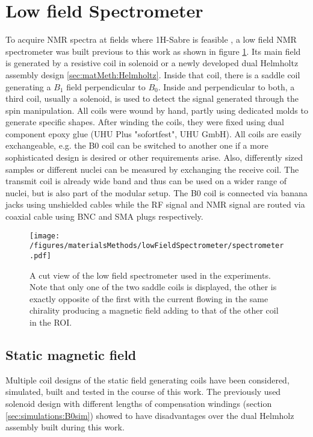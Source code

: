         \section{Low field Spectrometer}
        \label{sec:matMeth:lowFieldSpectrometer}
        To acquire NMR spectra at fields where 1H-Sabre is feasible \cite{rayner_signal_2018}, a low field NMR spectrometer was built \cite{borowiak_battery-driven_2013-1} previous to this work as shown in figure \ref{figure:materialsMethods:lowFieldSpec}. Its main field is generated by a resistive coil in solenoid or a newly developed dual Helmholtz assembly design \ref{sec:matMeth:Helmholtz}. Inside that coil, there is a saddle coil generating a $B_1$ field perpendicular to $B_0$. Inside and perpendicular to both, a third coil, usually a solenoid, is used to detect the signal generated through the spin manipulation. All coils were wound by hand, partly using dedicated molds to generate specific shapes. After winding the coils, they were fixed using dual component epoxy glue (UHU Plus "sofortfest", UHU GmbH).
        All coils are easily exchangeable, e.g. the B0 coil can be switched to another one if a more sophisticated design is desired or other requirements arise. Also, differently sized samples or different nuclei can be measured by exchanging the receive coil. The transmit coil is already wide band and thus can be used on a wider range of nuclei, but is also part of the modular setup. The B0 coil is connected via banana jacks using unshielded cables while the RF signal and NMR signal are routed via coaxial cable using BNC  and SMA plugs respectively.
        \begin{figure}
            \label{figure:matMeth:lowFieldSpectrometer}
            \texttt{[image: /figures/materialsMethods/lowFieldSpectrometer/spectrometer.pdf]}
            \caption[Schematic view low field spectrometer]{A cut view of the low field spectrometer used in the experiments. Note that only one of the two saddle coils is displayed, the other is exactly opposite of the first with the current flowing in the same chirality producing a magnetic field adding to that of the other coil in the ROI. }
            \label{figure:materialsMethods:lowFieldSpec}
        \end{figure}
        \subsection{Static magnetic field}
        Multiple coil designs of the static field generating coils have been  considered, simulated, built and tested in the course of this work. The previously used solenoid design with different lengths of compensation windings (section \ref{sec:simulations:B0sim}) showed to have disadvantages over the dual Helmholz assembly built during this work.
